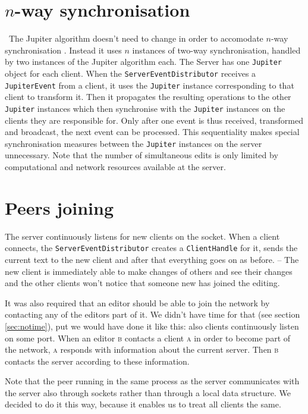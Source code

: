 \documentclass[a4paper,final,12pt,oneside,article,table]{memoir}
\newcommand{\mil}[1]{\texttt{#1}}
\begin{document}
\chapter{$n$-way synchronisation}



\
The Jupiter algorithm doesn't need to change in order to accomodate
$n$-way synchronisation \cite{Jupiter}. Instead it uses $n$ instances of
two-way synchronisation, handled by two instances of the Jupiter
algorithm each. The Server has one \mil{Jupiter} object for each client.
When the \mil{ServerEventDistributor} receives a \mil{JupiterEvent} from
a client, it uses the \mil{Jupiter} instance corresponding to that
client to transform it. Then it propagates the resulting operations to
the other \mil{Jupiter} instances which then synchronise with the
\mil{Jupiter} instances on the clients they are responsible for. Only
after one event is thus received, transformed and broadcast, the next
event can be processed. This sequentiality makes special synchronisation
measures between the \mil{Jupiter} instances on the server unnecessary.
Note that the number of simultaneous edits is only limited by
computational and network resources available at the server.



\chapter{Peers joining}
\label{sec:joining}

The server continuously listens for new clients on the socket. When a
client connects, the \mil{ServerEventDistributor} creates a
\mil{ClientHandle} for it, sends the current text to the new client
and after that everything goes on as before. – The new client is
immediately able to make changes of others and see their changes and
the other clients won't notice that someone new has joined the
editing.

It was also required that an editor should be able to join the network
by contacting any of the editors part of it. We didn't have time for
that (see section \ref{sec:notime}), put we would have done it like
this: also clients continuously listen on some port. When an editor
\textsc{b} contacts a client \textsc{a} in order to become part of the
network, \textsc{a} responds with information about the current server.
Then \textsc{b} contacts the server according to these information.

Note that the peer running in the same process as the server
communicates with the server also through sockets rather than through a
local data structure. We decided to do it this way, because it enables
us to treat all clients the same.
\end{document}
